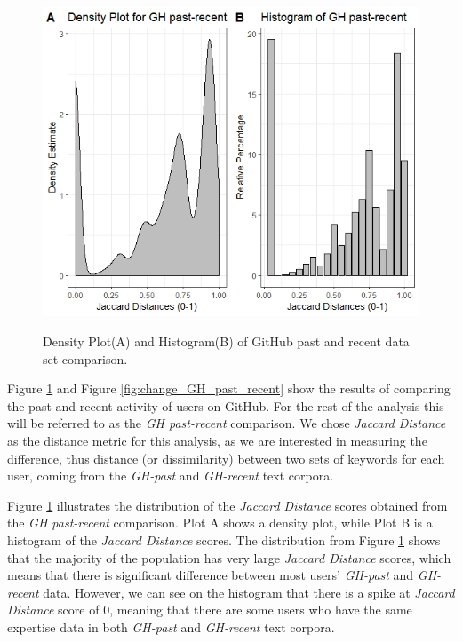         \begin{figure}
          \centering
          \includegraphics[width=\textwidth]{figures/GH_past-recent.jpeg}\\
          \caption{Density Plot(A) and Histogram(B) of GitHub past and recent data set comparison.}
          \label{fig:GH_past_recent}
        \end{figure}
        
        Figure \ref{fig:GH_past_recent} and Figure \ref{fig:change_GH_past_recent} show the results of comparing the past and recent activity of users on GitHub. For the rest of the analysis this will be referred to as the \emph{GH past-recent} comparison. We chose \emph{Jaccard Distance} as the distance metric for this analysis, as we are interested in measuring the difference, thus distance (or dissimilarity) between two sets of keywords for each user, coming from the \emph{GH-past} and \emph{GH-recent} text corpora. 
        
        Figure \ref{fig:GH_past_recent} illustrates the distribution of the \emph{Jaccard Distance} scores obtained from the \emph{GH past-recent} comparison. Plot A shows a density plot, while Plot B is a histogram of the \emph{Jaccard Distance} scores. The distribution from Figure \ref{fig:GH_past_recent} shows that the majority of the population has very large \emph{Jaccard Distance} scores, which means that there is significant difference between most users' \emph{GH-past} and \emph{GH-recent} data. However, we can see on the histogram that there is a spike at \emph{Jaccard Distance} score of 0, meaning that there are some users who have the same expertise data in both \emph{GH-past} and \emph{GH-recent} text corpora. 
        
